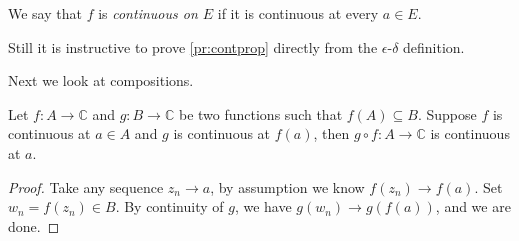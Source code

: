 \begin{note}
    We say that \(f\) is \textit{continuous on \(E\)} if it is continuous at every \(a \in E\).
\end{note}
\begin{remark}
    Still it is instructive to prove \cref{pr:contprop} directly from the \(\epsilon\)-\(\delta\) definition.
\end{remark}
Next we look at compositions.
\begin{theorem}{}{}
    Let \(f: A \to \mathbb{C}\) and \(g: B \to \mathbb{C}\) be two functions such that \(f(A) \subseteq B\). Suppose \(f\) is continuous at \(a \in A\) and \(g\) is continuous at \(f(a)\), then \(g\circ f: A \to \mathbb{C}\) is continuous at \(a\).
\end{theorem}
\begin{proof}
    Take any sequence \(z_n \to a\), by assumption we know \(f(z_n) \to f(a)\). Set \(w_n = f(z_n) \in B\). By continuity of \(g\), we have \(g(w_n) \to g(f(a))\), and we are done.
\end{proof}
